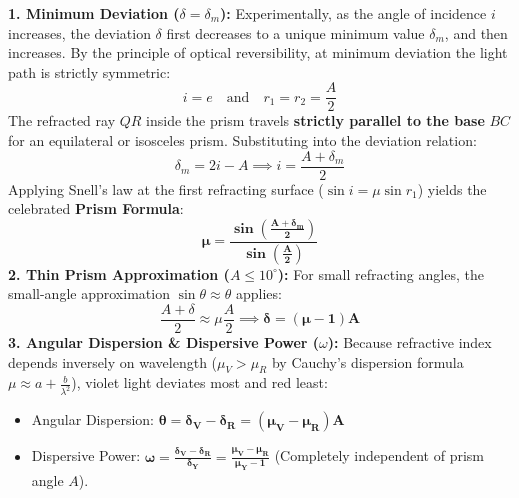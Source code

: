 \documentclass[10pt,twoside,openright]{book}
\begin{document}
\begin{formulabox}
\textbf{1. Minimum Deviation ($\delta = \delta_m$):}
Experimentally, as the angle of incidence $i$ increases, the deviation $\delta$ first decreases to a unique minimum value $\delta_m$, and then increases. By the principle of optical reversibility, at minimum deviation the light path is strictly symmetric:
\begin{equation}
  i = e \quad \text{and} \quad r_1 = r_2 = \frac{A}{2}
\end{equation}
The refracted ray $QR$ inside the prism travels \textbf{strictly parallel to the base} $BC$ for an equilateral or isosceles prism. Substituting into the deviation relation:
\begin{equation}
  \delta_m = 2i - A \implies i = \frac{A + \delta_m}{2}
\end{equation}
Applying Snell's law at the first refracting surface ($\sin i = \mu \sin r_1$) yields the celebrated \textbf{Prism Formula}:
\begin{equation}
  \mathbf{\mu = \frac{\sin\left(\frac{A + \delta_m}{2}\right)}{\sin\left(\frac{A}{2}\right)}}
\end{equation}
\textbf{2. Thin Prism Approximation ($A \le 10^\circ$):}
For small refracting angles, the small-angle approximation $\sin\theta \approx \theta$ applies:
\begin{equation}
  \frac{A + \delta}{2} \approx \mu \frac{A}{2} \implies \mathbf{\delta = (\mu - 1) A}
\end{equation}
\textbf{3. Angular Dispersion \& Dispersive Power ($\omega$):}
Because refractive index depends inversely on wavelength ($\mu_V > \mu_R$ by Cauchy's dispersion formula $\mu \approx a + \frac{b}{\lambda^2}$), violet light deviates most and red least:
\begin{itemize}
  \item Angular Dispersion: $\mathbf{\theta = \delta_V - \delta_R = (\mu_V - \mu_R) A}$
  \item Dispersive Power: $\mathbf{\omega = \frac{\delta_V - \delta_R}{\delta_Y} = \frac{\mu_V - \mu_R}{\mu_Y - 1}}$ (Completely independent of prism angle $A$).
\end{itemize}
\end{formulabox}
\end{document}
